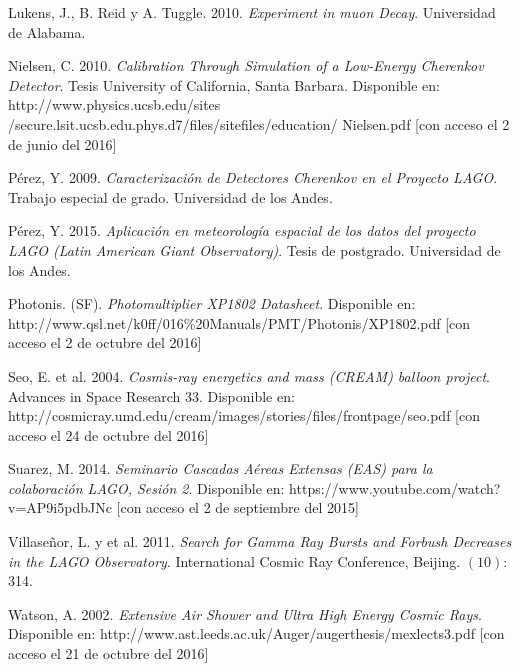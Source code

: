 \documentclass{book}
\begin{document}
\begin{thebibliography}{9}
 Lukens, J., B. Reid y A. Tuggle.  2010. \textit{Experiment in muon Decay}. Universidad de Alabama.

 Nielsen, C.  2010. \textit{Calibration Through Simulation of a Low-Energy Cherenkov Detector}. Tesis University of California, Santa Barbara. Disponible en: http://www.physics.ucsb.edu/sites\\/secure.lsit.ucsb.edu.phys.d7/files/sitefiles/education/ Nielsen.pdf [con acceso el 2 de junio del 2016]

 P\'erez, Y. 2009. \textit{Caracterizaci\'on de Detectores Cherenkov en el Proyecto LAGO}. Trabajo especial de grado. Universidad de los Andes.

 P\'erez, Y. 2015. \textit{Aplicaci\'on en meteorolog\'ia espacial de los datos del proyecto LAGO (Latin American Giant Observatory)}. Tesis de postgrado. Universidad de los Andes.

 Photonis. (SF). \textit{Photomultiplier XP1802 Datasheet}. Disponible en: http://www.qsl.net/k0ff/016\%20Manuals/PMT/Photonis/XP1802.pdf [con acceso el 2 de octubre del 2016]

 Seo, E. et al. 2004. \textit{Cosmis-ray energetics and mass (CREAM) balloon project}. Advances in Space Research 33. Disponible en: http://cosmicray.umd.edu/cream/images/stories/files/frontpage/seo.pdf [con acceso el 24 de octubre del 2016]

 Suarez, M. 2014. \textit{Seminario Cascadas A\'ereas Extensas (EAS) para la colaboraci\'on LAGO, Sesi\'on 2}. Disponible en: https://www.youtube.com/watch?v=AP9i5pdbJNc [con acceso el 2 de septiembre del 2015]

 Villase\~nor, L. y et al. 2011. \textit{Search for Gamma Ray Bursts and Forbush Decreases in the LAGO Observatory}. International Cosmic Ray Conference, Beijing. $(10)$: 314.

 Watson, A. 2002. \textit{Extensive Air Shower and Ultra High Energy Cosmic Rays}. Disponible en: http://www.ast.leeds.ac.uk/Auger/augerthesis/mexlects3.pdf [con acceso el 21 de octubre del 2016]


\end{thebibliography}
\end{document}
